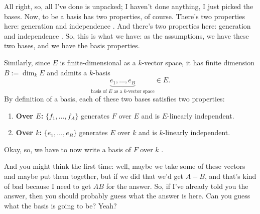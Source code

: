 \begin{proofWrapper}
\begin{speech}[00:26:18 - 00:27:20]
All right, so, all I've done is unpacked; I haven't done anything, I just picked the bases. Now, to be a basis has two properties, of course. There's two properties here: generation and independence . And there's two properties here: generation and independence . So, this is what we have: as the assumptions, we have these two bases, and we have the basis properties.
\end{speech}

\begin{content}
Similarly, since $E$ is finite-dimensional as a $k$-vector space, it has finite dimension $B := \dim_k E$ and admits a $k$-basis
\[
\underbrace{e_1, \dots, e_B}_{\text{basis of } E \text{ as a } k\text{-vector space}} \in E.
\]
By definition of a basis, each of these two bases satisfies two properties:
\begin{enumerate}[label=\textbf{(\arabic*)}]
    \item \textbf{Over $E$:} $\{f_1, \dots, f_A\}$ generates $F$ over $E$ and is $E$-linearly independent.
    \item \textbf{Over $k$:} $\{e_1, \dots, e_B\}$ generates $E$ over $k$ and is $k$-linearly independent.
\end{enumerate}
\end{content}

\begin{hidden}
\end{hidden}

\begin{speech}[00:27:21 - 00:27:57]
Okay, so, we have to now write a basis of $F$ over $k$ .

And you might think the first time: well, maybe we take some of these vectors and maybe put them together, but if we did that we'd get $A + B$, and that's kind of bad because I need to get $AB$ for the answer. So, if I've already told you the answer, then you should probably guess what the answer is here. Can you guess what the basis is going to be? Yeah?
\end{speech}


\end{proofWrapper}
